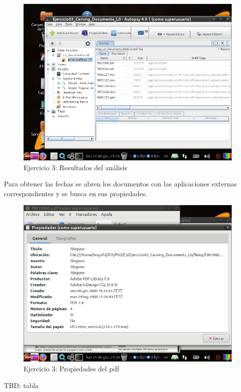 \documentclass[11pt]{article}
\begin{document}
\begin{figure}[H]
  \caption{Ejercicio 3: Resultados del análisis}
  \centering
  \includegraphics[scale=0.7]{e3-5.png}
\end{figure}

Para obtener las fechas se abren los documentos con las aplicaciones externas correspondientes y se busca en sus propiedades.

\begin{figure}[H]
  \caption{Ejercicio 3: Propiedades del pdf}
  \centering
  \includegraphics[scale=0.7]{e3-6.png}
\end{figure}

TBD: tabla

\end{document}
